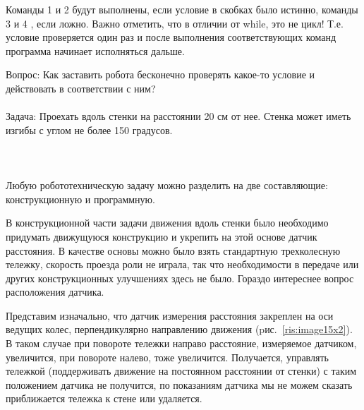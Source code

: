 Команды 1 и 2 будут выполнены, если условие в скобках было истинно, команды 3 и 4 , если ложно. Важно отметить, что в отличии от while, это не цикл! Т.е. условие проверяется один раз и после выполнения соответствующих команд программа начинает исполняться дальше.

Вопрос: Как заставить робота бесконечно проверять какое-то условие и действовать в соответствии с ним?\\\\

Задача: Проехать  вдоль стенки на расстоянии 20 см от нее. Стенка может иметь изгибы с углом не более 150 градусов.\\\\

{\hypertarget{lesson15x4}{}}\\\\

Любую робототехническую задачу можно разделить на две составляющие: конструкционную и программную. 

В конструкционной части задачи движения вдоль стенки было необходимо придумать движущуюся конструкцию и укрепить на этой основе датчик расстояния. В качестве основы можно было взять стандартную трехколесную тележку, скорость проезда роли не играла, так что необходимости в передаче или других конструкционных улучшениях здесь не было. Гораздо интереснее вопрос расположения датчика.

Представим изначально, что датчик измерения расстояния закреплен на оси ведущих колес, перпендикулярно направлению движения (pис.~\ref{ris:image15x2}). В таком случае при повороте тележки направо расстояние, измеряемое датчиком, увеличится, при повороте налево, тоже увеличится. Получается, управлять тележкой (поддерживать движение на постоянном расстоянии от стенки) с таким положением датчика не получится, по показаниям датчика мы не можем сказать приближается тележка к стене или удаляется.

